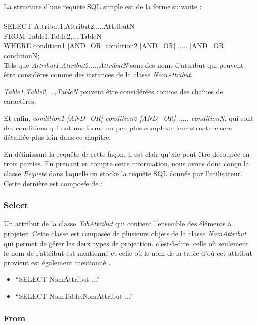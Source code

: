 \documentclass[oneside,13pt,a4paper]{report}
\begin{document}
\pagebreak

La structure d'une requête SQL simple est de la forme suivante : \\
\\SELECT Attribut1,Attribut2,...,AttributN\\FROM Table1,Table2,...,TableN\\WHERE condition1 [AND \textbar~OR] condition2 [AND \textbar~OR] ..... [AND \textbar~OR] conditionN;\\

Tels que \textit{Attribut1,Attribut2,...,AttributN} sont des noms d'attribut qui peuvent être considères comme des instances de la classe \textit{NomAttribut}.

\textit{Table1,Table2,...,TableN} peuvent être considérées comme des chaînes de caractères.

Et enfin, \textit{condition1 [AND \textbar~OR] condition2 [AND \textbar~OR] ..... conditionN}, qui sont des conditions
qui ont une forme un peu plus complexe, leur structure sera détaillée  plus loin dans ce chapitre.

En définissant la requête de cette façon, il est clair qu'elle peut être découpée en trois parties. En prenant en compte cette information, nous avons donc conçu la classe \textit{Requete} dans laquelle on stocke la requête SQL donnée par l'utilisateur. Cette dernière est composée de :

\subsubsection{Select}

Un attribut de la classe \textit{TabAttribut} qui contient l'ensemble des éléments à projeter. Cette classe est composée de plusieurs objets de la classe \textit{NomAttribut} qui permet de gérer les deux types de projection. c'est-à-dire, celle où seulement le nom de l'attribut est mentionné et celle où le nom de la table d'où cet attribut provient est également mentionné .

\begin{itemize}
	\item \enquote{SELECT NomAttribut ...}
	\item \enquote{SELECT NomTable.NomAttribut ...}
\end{itemize}

\subsubsection{From}
\end{document}
